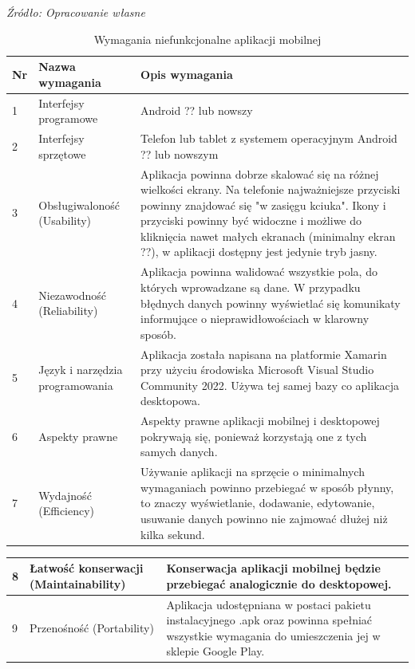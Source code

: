 \documentclass[12pt,oneside]{report}
\begin{document}
\begin{table}[H]
	\caption{Wymagania niefunkcjonalne aplikacji mobilnej }
	\textit{Źródło: Opracowanie własne}
	\label{WymaganiaNFmobilne}
	\centering
	\begin{tabular}{|l|l|p{8cm}|}
		\hline
		Nr & Nazwa wymagania & Opis wymagania\\
		\hline
		1& Interfejsy programowe& Android ?? lub nowszy \\		
		\hline
		2& Interfejsy sprzętowe& Telefon lub tablet z systemem operacyjnym Android ?? lub nowszym \\	
		\hline	
		3& Obsługiwaloność (Usability)& 
		Aplikacja powinna dobrze skalować się na różnej wielkości ekrany. Na telefonie najważniejsze przyciski powinny znajdować się "w zasięgu kciuka". Ikony i przyciski powinny być widoczne i możliwe do kliknięcia nawet małych ekranach (minimalny ekran ??), w aplikacji dostępny jest jedynie tryb jasny.\\		
		\hline
		4& Niezawodność (Reliability)&Aplikacja powinna walidować wszystkie pola, do których wprowadzane są dane. W przypadku błędnych danych powinny wyświetlać się komunikaty informujące o nieprawidłowościach w klarowny sposób. \\	
		\hline
		5& Język i narzędzia programowania& Aplikacja została napisana na platformie Xamarin przy użyciu środowiska  Microsoft Visual Studio Community 2022. Używa tej samej bazy co aplikacja desktopowa. \\	
		\hline
		6& Aspekty prawne& Aspekty prawne aplikacji mobilnej i desktopowej pokrywają się, ponieważ korzystają one z tych samych danych.\\	
		\hline
		7& Wydajność (Efficiency)&
		Używanie aplikacji na sprzęcie o minimalnych wymaganiach powinno przebiegać w sposób płynny, to znaczy wyświetlanie, dodawanie, edytowanie, usuwanie danych powinno nie zajmować dłużej niż kilka sekund. \\	
		\hline	
	\end{tabular}
\end{table}

\begin{table}
	\begin{tabular}{|l|l|p{8cm}|}
		\hline
		8& Łatwość konserwacji (Maintainability)&
		Konserwacja aplikacji mobilnej będzie przebiegać analogicznie do desktopowej. \\	
		\hline
		9& Przenośność (Portability)&Aplikacja udostępniana w postaci pakietu instalacyjnego .apk oraz powinna spełniać wszystkie wymagania do umieszczenia jej w sklepie Google Play. \\
		\hline
	\end{tabular}
\end{table}
\end{document}
